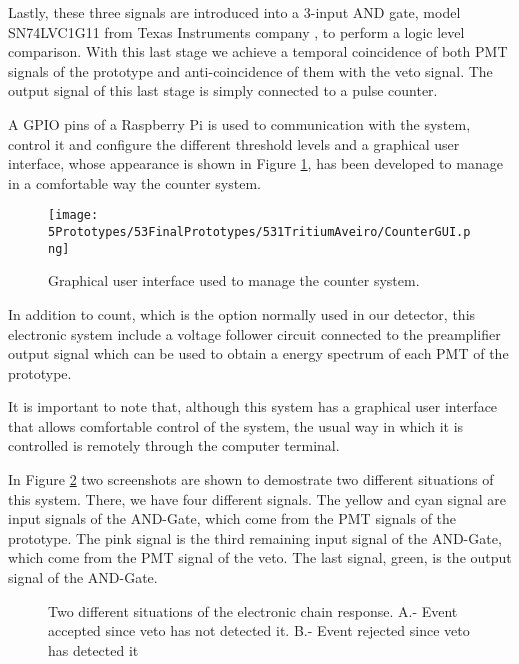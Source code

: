 \begin{enumerate}
Lastly, these three signals are introduced into a 3-input AND gate, model SN74LVC1G11 from Texas Instruments company \cite{ANDGate}, to perform a logic level comparison. With this last stage we achieve a temporal coincidence of both PMT signals of the prototype and anti-coincidence of them with the veto signal. The output signal of this last stage is simply connected to a pulse counter. 

A GPIO pins of a Raspberry Pi is used to communication with the system, control it and configure the different threshold levels and a graphical user interface, whose appearance is shown in Figure \ref{fig:GUIcounts}, has been developed to manage in a comfortable way the counter system.

 \begin{figure}[h]
\centering
\texttt{[image: 5Prototypes/53FinalPrototypes/531TritiumAveiro/CounterGUI.png]}
\caption{Graphical user interface used to manage the counter system. \label{fig:GUIcounts}}
\end{figure}

In addition to count, which is the option normally used in our detector, this electronic system include a voltage follower circuit connected to the preamplifier output signal which can be used to obtain a energy spectrum of each PMT of the prototype.

It is important to note that, although this system has a graphical user interface that allows comfortable control of the system, the usual way in which it is controlled is remotely through the computer terminal.

In Figure \ref{fig:ScreenshotElectronic} two screenshots are shown to demostrate two different situations of this system. There, we have four different signals. The yellow and cyan signal are input signals of the AND-Gate, which come from the PMT signals of the prototype. The pink signal is the third remaining input signal of the AND-Gate, which come from the PMT signal of the veto. The last signal, green, is the output signal of the AND-Gate.

\begin{figure}[h]
 \centering
 \caption{Two different situations of the electronic chain response. A.- Event accepted since veto has not detected it. B.- Event rejected since veto has detected it}
 \label{fig:ScreenshotElectronic}
\end{figure}


\end{enumerate}
